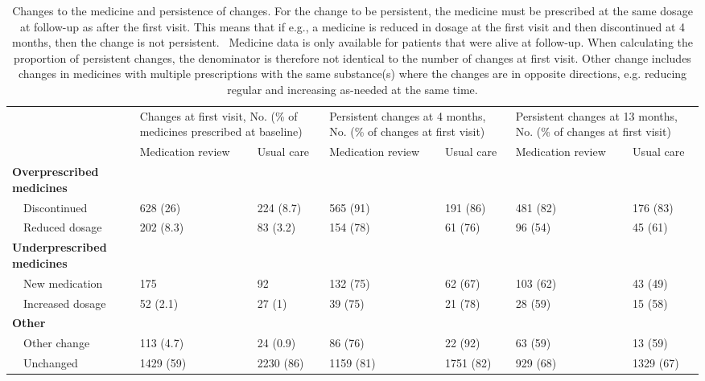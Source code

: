 \begin{table}[]
\caption{Changes to the medicine and persistence of changes. For the change to be persistent, the medicine must be prescribed at the same dosage at follow-up as after the first visit. This means that if e.g., a medicine is reduced in dosage at the first visit and then discontinued at 4 months, then the change is not persistent.  Medicine data is only available for patients that were alive at follow-up. When calculating the proportion of persistent changes, the denominator is therefore not identical to the number of changes at first visit. Other change includes changes in medicines with multiple prescriptions with the same substance(s) where the changes are in opposite directions, e.g. reducing regular and increasing as-needed at the same time.}
\begin{tabularx}{\textwidth}{XXXXXXX}
\toprule
\multirow{2}{*}{} &
  \multicolumn{2}{l}{Changes at first visit, No. (\% of medicines prescribed at baseline)} &
  \multicolumn{2}{l}{Persistent changes at 4   months, No. (\% of changes at first visit)} &
  \multicolumn{2}{l}{Persistent changes at 13   months, No. (\% of changes at first visit)} \\ \cmidrule(l){2-7} 
                                   & Medication review & Usual care & Medication review & Usual care & Medication review & Usual care \\ \cmidrule(r){1-1}
\textbf{Overprescribed medicines}  &                   &            &                   &            &                   &            \\
~~Discontinued                     & 628 (26)          & 224 (8.7)  & 565 (91)          & 191 (86)   & 481 (82)          & 176 (83)   \\
~~Reduced dosage                   & 202 (8.3)         & 83 (3.2)   & 154 (78)          & 61 (76)    & 96 (54)           & 45 (61)    \\
\textbf{Underprescribed medicines} &                   &            &                   &            &                   &            \\
~~New medication                   & 175               & 92         & 132 (75)          & 62 (67)    & 103 (62)          & 43 (49)    \\
~~Increased dosage                 & 52 (2.1)          & 27 (1)     & 39 (75)           & 21 (78)    & 28 (59)           & 15 (58)    \\
\textbf{Other}                     &                   &            &                   &            &                   &            \\
~~Other change                     & 113 (4.7)         & 24 (0.9)   & 86 (76)           & 22 (92)    & 63 (59)           & 13 (59)    \\
~~Unchanged                        & 1429 (59)         & 2230 (86)  & 1159 (81)         & 1751 (82)  & 929 (68)          & 1329 (67)  \\ \bottomrule
\end{tabularx}
\end{table}